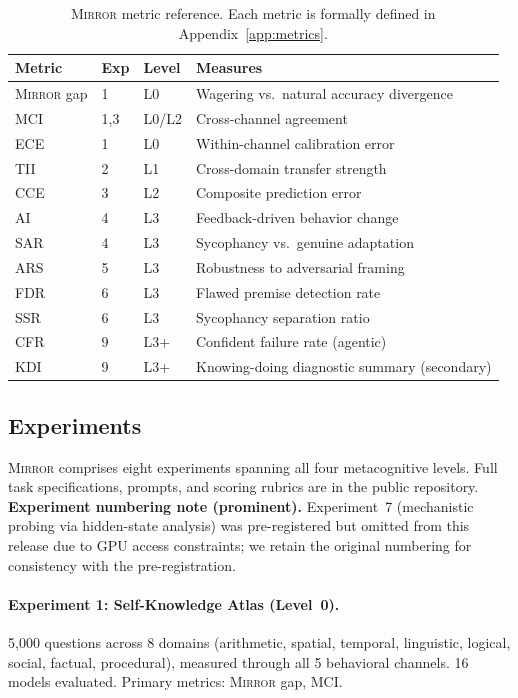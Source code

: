 \documentclass[10pt]{article}
\newcommand{\mirror}{\textsc{Mirror}}
\newcommand{\MCI}{MCI}
\newcommand{\CCE}{CCE}
\newcommand{\ARS}{ARS}
\newcommand{\KDI}{KDI}
\newcommand{\CFR}{CFR}
\newcommand{\SSR}{SSR}
\newcommand{\FDR}{FDR}
\newcommand{\TII}{TII}
\newcommand{\SAR}{SAR}
\newcommand{\AI}{AI}
\begin{document}
\begin{table}[h]
\centering
\caption{\mirror{} metric reference. Each metric is formally defined in Appendix~\ref{app:metrics}.}
\label{tab:metrics}
\small
\begin{tabular}{llll}
\toprule
Metric & Exp & Level & Measures \\
\midrule
\mirror{} gap & 1 & L0 & Wagering vs.\ natural accuracy divergence \\
\MCI{} & 1,3 & L0/L2 & Cross-channel agreement \\
ECE & 1 & L0 & Within-channel calibration error \\
\TII{} & 2 & L1 & Cross-domain transfer strength \\
\CCE{} & 3 & L2 & Composite prediction error \\
\AI{} & 4 & L3 & Feedback-driven behavior change \\
\SAR{} & 4 & L3 & Sycophancy vs.\ genuine adaptation \\
\ARS{} & 5 & L3 & Robustness to adversarial framing \\
\FDR{} & 6 & L3 & Flawed premise detection rate \\
\SSR{} & 6 & L3 & Sycophancy separation ratio \\
\CFR{} & 9 & L3+ & Confident failure rate (agentic) \\
\KDI{} & 9 & L3+ & Knowing-doing diagnostic summary (secondary) \\
\bottomrule
\end{tabular}
\end{table}

\subsection{Experiments}

\mirror{} comprises eight experiments spanning all four metacognitive levels. Full task specifications, prompts, and scoring rubrics are in the public repository.
\textbf{Experiment numbering note (prominent).} Experiment~7 (mechanistic probing via hidden-state analysis) was pre-registered but omitted from this release due to GPU access constraints; we retain the original numbering for consistency with the pre-registration.

\paragraph{Experiment 1: Self-Knowledge Atlas (Level~0).}
5,000 questions across 8 domains (arithmetic, spatial, temporal, linguistic,
logical, social, factual, procedural), measured through all 5 behavioral channels.
16 models evaluated. Primary metrics: \mirror{} gap, \MCI{}.
\end{document}
